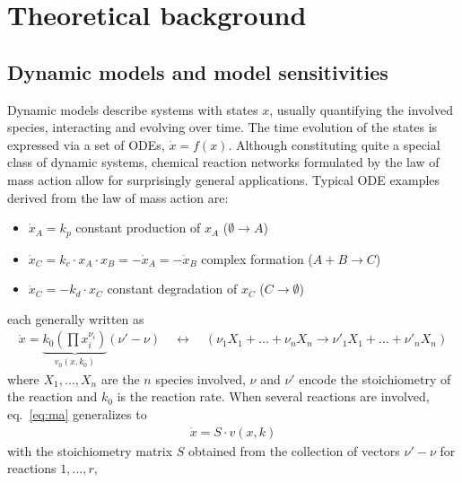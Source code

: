 \documentclass[article]{jss}
\begin{document}
\section{Theoretical background}
\label{sec:theory}

\subsection{Dynamic models and model sensitivities}
Dynamic models describe systems with states $x$, usually quantifying the involved species, interacting and evolving over time. %
The time evolution of the states is expressed via a set of ODEs, $\dot x = f(x)$. Although constituting quite a special class of dynamic systems, chemical reaction networks formulated by the law of mass action allow for surprisingly general applications. Typical ODE examples derived from the law of mass action are:
\begin{itemize}
	\item $\dot x_A = k_p$ constant production of $x_A$ ($\emptyset \rightarrow A$)
	\item $\dot x_C = k_c \cdot x_A \cdot x_B = - \dot x_A = - \dot x_B$ complex formation ($A+B \rightarrow C$)
	\item $\dot x_C = - k_d \cdot x_C$ constant degradation of $x_C$ ($C \rightarrow \emptyset$)
\end{itemize}
each generally written as 
\begin{align}
	\dot x = \underbrace{k_0 \left(\prod x_i^{\nu_i}\right)}_{v_0(x, k_0)} (\nu' - \nu) \quad\leftrightarrow\quad (\nu_1 X_1 + \dots + \nu_n X_n \longrightarrow \nu'_1 X_1 + \dots + \nu'_n X_n)
	\label{eq:ma}
\end{align}
where $X_1, \dots, X_n$ are the $n$ species involved, $\nu$ and $\nu'$ encode the stoichiometry of the reaction and $k_0$ is the reaction rate. When several reactions are involved, eq.~\eqref{eq:ma} generalizes to 
\begin{align}
	\dot x = S\cdot v(x, k)
	\label{eq:Sv}
\end{align}
with the stoichiometry matrix $S$
obtained from the collection of vectors $\nu' - \nu$ for reactions $1, \dots, r$,
\end{document}
